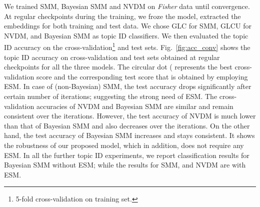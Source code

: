 \documentclass[journal]{IEEEtran}
\begin{document}
We trained SMM, Bayesian SMM and NVDM on \textit{Fisher} data until 
convergence. At regular checkpoints during the training, we froze the model, 
extracted the embeddings for both training and test data. We chose GLC for SMM, 
GLCU for NVDM, and Bayesian SMM as topic ID classifiers. We then evaluated 
the topic ID accuracy on the cross-validation\footnote{5-fold cross-validation 
on training set.} and test sets.  Fig.~\ref{fig:acc_conv} shows the topic ID 
accuracy on cross-validation and test sets obtained at regular checkpoints for 
all the three models. The circular dot ( represents the best 
cross-validation score and the corresponding test score that is obtained by 
employing ESM. In case of (non-Bayesian) SMM, the test 
accuracy drops significantly after certain number of iterations; suggesting the 
strong need of ESM. The cross-validation accuracies of NVDM and 
Bayesian SMM are similar and remain consistent over the iterations. However, 
the test 
accuracy of NVDM is much lower than that of Bayesian SMM and also decreases 
over the iterations. On the other hand, the test accuracy of Bayesian SMM 
increases and stays consistent. It shows the robustness of our proposed model, 
which in addition, does not require any ESM. In all the further 
topic ID experiments, we report classification results for Bayesian SMM without 
ESM; while the results for SMM, and NVDM are with ESM.
\end{document}
